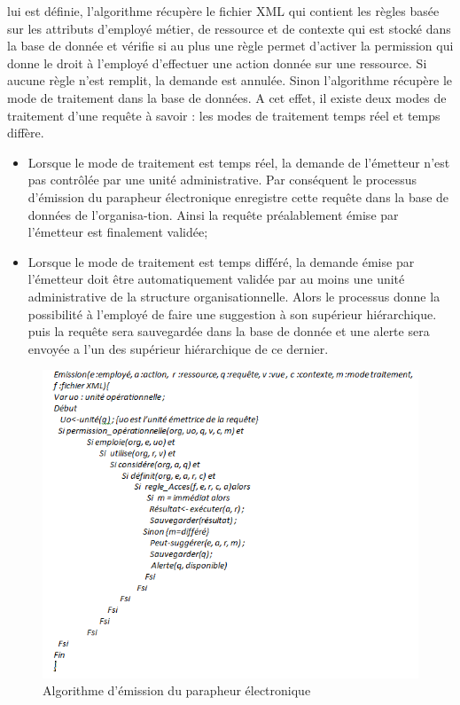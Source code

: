 lui est définie, l'algorithme récupère le fichier XML qui contient les règles basée sur les attributs d'employé métier, de ressource et de contexte qui est stocké dans la base de donnée et vérifie si au plus une règle permet d'activer la permission qui donne le droit à l'employé d'effectuer une action donnée sur une ressource. Si aucune règle n'est remplit, la demande est annulée. Sinon l'algorithme récupère le mode de traitement dans la base de données. A cet effet, il existe deux modes de traitement d'une requête à savoir : les modes de traitement temps réel et temps diffère.
\begin{itemize}
\item Lorsque le mode de traitement est temps réel, la demande de l'émetteur n'est pas contrôlée par une unité administrative. Par conséquent le processus d'émission du parapheur électronique enregistre cette requête dans la base de données de l'organisa-tion. Ainsi la requête préalablement émise par l'émetteur est finalement validée;
\item Lorsque le mode de traitement est temps différé, la demande émise par l'émetteur doit être automatiquement validée par au moins une unité administrative de la structure organisationnelle. Alors le processus donne la possibilité à l'employé de faire une suggestion à son supérieur hiérarchique. puis la requête sera sauvegardée dans la base de donnée et une alerte sera envoyée a l'un des supérieur hiérarchique de ce dernier.
\end{itemize}

\begin{figure}[h!]
    \centering
		\includegraphics[scale=0.7]{chap3/images/emission.png}
    \caption{Algorithme d'émission du parapheur électronique}
	 \label{figemission}
\end{figure} 



